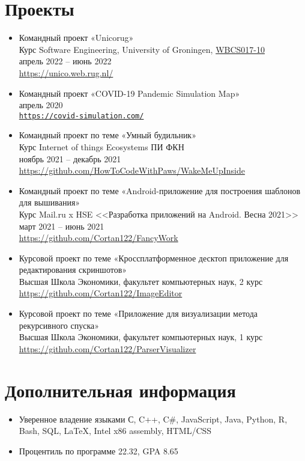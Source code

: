 \documentclass[12pt]{article}
\begin{document}
  \section{Проекты}
  \begin{itemize}
    \item Командный проект «Unicorug» \\
    Курс Software Engineering, University of Groningen,
    \href{https://www.rug.nl/ocasys/fwn/vak/show?code=WBCS017-10}{WBCS017-10} \\
    апрель 2022 -- июнь 2022 \\
    \url{https://unico.web.rug.nl/}

    \item Командный проект «COVID-19 Pandemic Simulation Map» \\
    апрель 2020 \\
    \href{http://covid-simulation.tk/}{\texttt{https://covid-simulation.com/}}

    \item Командный проект по теме «Умный будильник» \\
    Курс Internet of things Ecosystems ПИ ФКН \\
    ноябрь 2021 -- декабрь 2021 \\
    \url{https://github.com/HowToCodeWithPaws/WakeMeUpInside}

    \item Командный проект по теме «Android-приложение для построения шаблонов для вышивания» \\
    Курс Mail.ru x HSE <<Разработка приложений на Android. Весна 2021>> \\
    март 2021 -- июнь 2021 \\
    \url{https://github.com/Cortan122/FancyWork}

    \item Курсовой проект по теме «Кроссплатформенное десктоп приложение для редактирования скриншотов» \\
    Высшая Школа Экономики, факультет компьютерных наук, 2 курс \\
    \url{https://github.com/Cortan122/ImageEditor}

    \item Курсовой проект по теме «Приложение для визуализации метода рекурсивного спуска» \\
    Высшая Школа Экономики, факультет компьютерных наук, 1 курс \\
    \url{https://github.com/Cortan122/ParserVisualizer}

  \end{itemize}

  \section{Дополнительная информация}
  \begin{itemize}
    \item Уверенное владение языками С, C++, C\#, JavaScript, Java, Python, R, Bash, SQL, \LaTeX, Intel x86 assembly, HTML/CSS
    \item Процентиль по программе 22.32, GPA 8.65
  \end{itemize}
\end{document}
